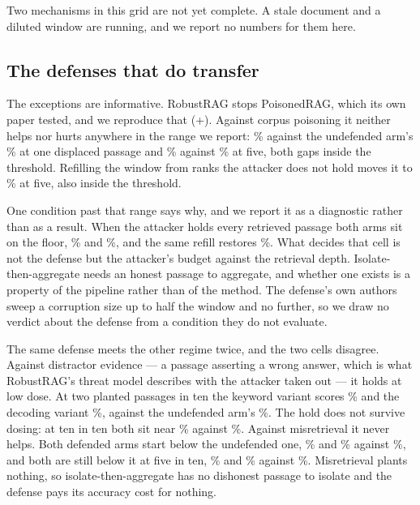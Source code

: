 Two mechanisms in this grid are not yet complete. A stale document and a
diluted window are running, and we report no numbers for them here.



\subsection{The defenses that do transfer}
\label{sec:transfer}

The exceptions are informative. RobustRAG stops PoisonedRAG, which its own
paper tested, and we reproduce that (+\ERobustPoisonedGain{}\pp). Against
corpus poisoning it neither helps nor hurts anywhere in the range we report:
\ERobustDispOneDef{}\% against the undefended arm's \ERobustDispOneUndef{}\%
at one displaced passage and \ERobustDispFiveDef{}\% against
\ERobustDispFiveUndef{}\% at five, both gaps inside the
\ERobustDispMdr{}\pp{} threshold. Refilling the window from ranks the
attacker does not hold moves it to \ERobustBackfillFive{}\% at five, also
inside the threshold.

One condition past that range says why, and we report it as a diagnostic
rather than as a result. When the attacker holds every retrieved passage both
arms sit on the floor, \ERobustDispTenDef{}\% and
\ERobustDispTenUndef{}\%, and the same refill restores
\ERobustBackfillTen{}\%. What decides that cell is not the defense but the
attacker's budget against the retrieval depth. Isolate-then-aggregate needs
an honest passage to aggregate, and whether one exists is a property of the
pipeline rather than of the method. The defense's own authors sweep a
corruption size up to half the window and no further, so we draw no verdict
about the defense from a condition they do not evaluate.

The same defense meets the other regime twice, and the two cells disagree.
Against distractor evidence --- a passage asserting a wrong answer, which is
what RobustRAG's threat model describes with the attacker taken out --- it
holds at low dose. At two planted passages in ten the keyword variant scores
\ERobustDistKeyTwo{}\% and the decoding variant \ERobustDistDecTwo{}\%,
against the undefended arm's \ERobustDistUndefTwo{}\%. The hold does not
survive dosing: at ten in ten both sit near \ERobustDistKeyTen{}\% against
\ERobustDistUndefTen{}\%. Against misretrieval it never helps. Both defended
arms start below the undefended one, \ERobustMisKeyClean{}\% and
\ERobustMisDecClean{}\% against \ERobustMisUndefClean{}\%, and both are
still below it at five in ten, \ERobustMisKeyFive{}\% and
\ERobustMisDecFive{}\% against \ERobustMisUndefFive{}\%. Misretrieval
plants nothing, so isolate-then-aggregate has no dishonest passage to isolate
and the defense pays its accuracy cost for nothing.

